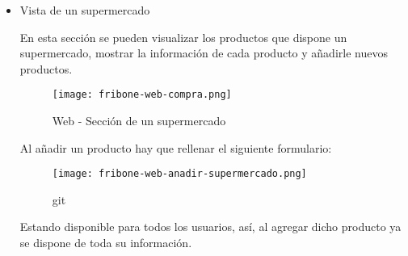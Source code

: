 \begin{itemize}
\begin{itemize}
                \item Vista de un supermercado

                    En esta sección se pueden visualizar los productos que dispone un supermercado, mostrar la información de cada producto y añadirle nuevos productos.

                    \begin{figure}[H]
                        \centering
                        \texttt{[image: fribone-web-compra.png]}
                        \caption{Web - Sección de un supermercado}\label{fig:fribone-web-supermercados}
                    \end{figure}

                    Al añadir un producto hay que rellenar el siguiente formulario:

                    \begin{figure}[H]
                        \centering
                        \texttt{[image: fribone-web-anadir-supermercado.png]}
                        \caption{git }\label{fig:fribone-web-anadir-supermercado}
                    \end{figure}

                    Estando disponible para todos los usuarios, así, al agregar dicho producto ya se dispone de toda su información.
            \end{itemize}
    \end{itemize}